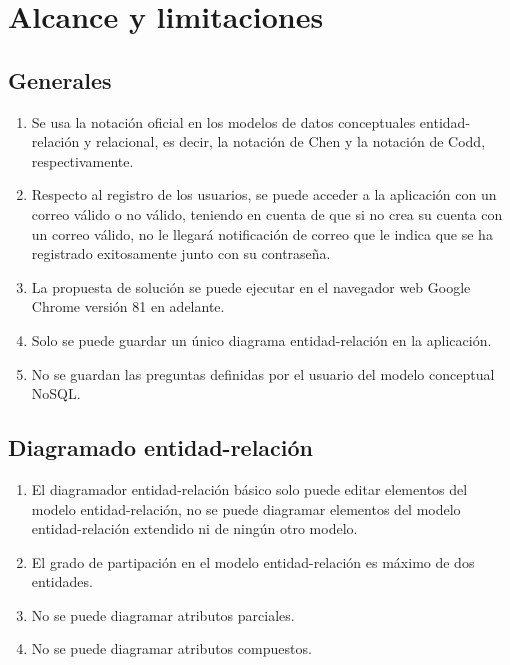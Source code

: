 \section{Alcance y limitaciones}\label{sec:alcance}
\subsection*{Generales}
\begin{enumerate}
    \item Se usa la notación oficial en los modelos de datos conceptuales entidad-relación y relacional, es decir, la notación de Chen y la notación de Codd, respectivamente.
    \item Respecto al registro de los usuarios, se puede acceder a la aplicación con un correo válido o no válido, teniendo en cuenta de que si no crea su cuenta con un correo válido, no le llegará notificación de correo que le indica que se ha registrado exitosamente junto con su contraseña.
    \item La propuesta de solución se puede ejecutar en el navegador web Google Chrome versión 81 en adelante.
    \item Solo se puede guardar un único diagrama entidad-relación en la aplicación.
    \item No se guardan las preguntas definidas por el usuario del modelo conceptual NoSQL.
    
\end{enumerate}

\subsection*{Diagramado entidad-relación}
\begin{enumerate}
    \item El diagramador entidad-relación básico solo puede editar elementos del modelo entidad-relación, no se puede diagramar elementos del modelo entidad-relación extendido ni de ningún otro modelo.
    \item El grado de partipación en el modelo entidad-relación es máximo de dos entidades.
    \item No se puede diagramar atributos parciales.
    \item No se puede diagramar atributos compuestos.
\end{enumerate}

